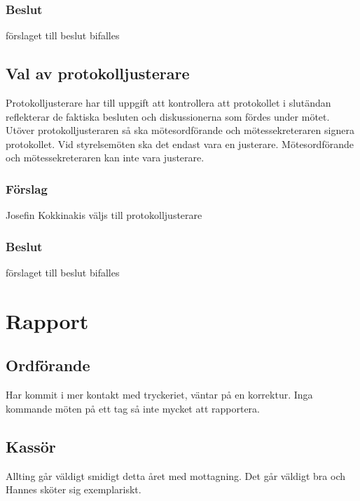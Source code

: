 \documentclass[protokoll]{dvd}
\begin{document}
\subsubsection*{Beslut}
\begin{attsatser}
    \item förslaget till beslut bifalles
\end{attsatser}

\subsection{Val av protokolljusterare}

Protokolljusterare har till uppgift att kontrollera att protokollet i slutändan reflekterar de faktiska besluten och diskussionerna som fördes under mötet.
Utöver protokolljusteraren så ska mötesordförande och mötessekreteraren signera protokollet.
Vid styrelsemöten ska det endast vara en justerare.
Mötesordförande och mötessekreteraren kan inte vara justerare.

\subsubsection*{Förslag}
\begin{attsatser}
    \item Josefin Kokkinakis väljs till protokolljusterare
\end{attsatser}
\subsubsection*{Beslut}
\begin{attsatser}
    \item förslaget till beslut bifalles
\end{attsatser}

\section{Rapport}
\subsection{Ordförande}
Har kommit i mer kontakt med tryckeriet, väntar på en korrektur. Inga kommande möten på ett tag så inte mycket att rapportera.

\subsection{Kassör}
Allting går väldigt smidigt detta året med mottagning. Det går väldigt bra och Hannes sköter sig exemplariskt.
\end{document}

